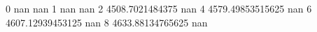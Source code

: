 0 nan nan
1 nan nan
2 4508.7021484375 nan
4 4579.49853515625 nan
6 4607.12939453125 nan
8 4633.88134765625 nan

